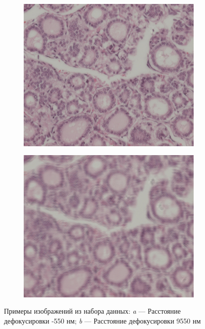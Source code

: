 \begin{figure}[!htbp]
	\begin{subfigure}[t]{0.45\linewidth}
		\centering
		\includegraphics[width=.95\linewidth]{my_folder/images/defocus-550.jpg}
		\caption{}
		\label{fig:data_axample_defocus-550}
	\end{subfigure}
	\hfill
	\begin{subfigure}[t]{0.45\linewidth}
		\centering
		\includegraphics[width=.95\linewidth]{my_folder/images/defocus9950.jpg}
		\caption{}
		\label{fig:data_axample_defocus9550}
	\end{subfigure}
	\caption{Примеры изображений из набора данных: {\itshape a} --- Расстояние дефокусировки -550 нм; {\itshape b} --- Расстояние дефокусировки 9550 нм}
	\label{fig:data_axample}
\end{figure}

